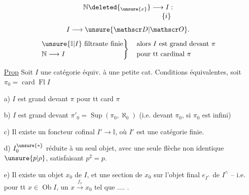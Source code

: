 \[
\begin{aligned}
\mathbb N\deleted{_{\unsure{x}}}&\longrightarrow I: \\[-2pt]
&\phantom{\longrightarrow}\{i\}
\end{aligned}
\]
\[
 I\longrightarrow\unsure{\mathscr D|\mathscr O}.
\]
\[
\left.\begin{aligned}
 &\unsure{\mathbb I|I}\ \text{filtrante finie}\\
 &\mathbb N\longrightarrow I
\end{aligned}\right\}\quad
\begin{aligned}
 &\text{alors $I$ est grand devant $\pi$}\\
 &\text{pour tt cardinal $\pi$}
\end{aligned}
\]

\uline{Prop} Soit $I$ une catégorie équiv. à une petite cat. Conditions équivalentes, soit $\pi_0=\operatorname{card}\operatorname{Fl} I$

a) $I$ est grand devant $\pi$ pour tt card $\pi$

b) $I$ est grand devant $\pi'_0=\operatorname{Sup}(\pi_0,\aleph_0)$ (i.e.  devant $\pi_0$, si $\pi_0$ est infini)

c) Il existe un foncteur cofinal $I'\longrightarrow\mathbb I$, où $I'$ est une catégorie  finie.

d)   $I^{\unsure{*}}_0$ réduite à un seul objet, avec une seule flèche non identique $\unsure{p|\rho}$, satisfaisant $p^2=p$.

e) Il existe un objet $x_0$ de $I$, et une section de $x_0$ sur l'objet final $e_{I^\wedge}$ de $I^\wedge$ -- i.e. pour tt $x\in\operatorname{Ob} I$, un $x\xrightarrow{f_x}x_0$ tel que .... .

